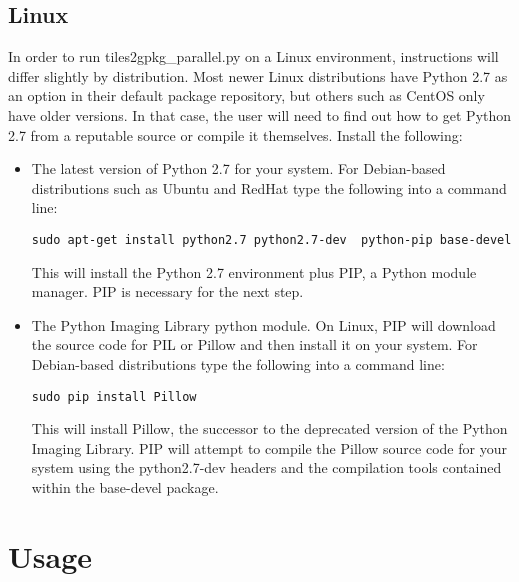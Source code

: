 \documentclass{article}
\begin{document}
\subsection{Linux}
In order to run tiles2gpkg\_parallel.py on a Linux environment, instructions
will differ slightly by distribution.  Most newer Linux distributions have
Python 2.7 as an option in their default package repository, but others such as
CentOS only have older versions.  In that case, the user will need to find out
how to get Python 2.7 from a reputable source or compile it themselves. Install
the following:
\begin{itemize}
    \item
        The latest version of Python 2.7 for your system.  For Debian-based
        distributions such as Ubuntu and RedHat type the following into a
        command line: 

        \lstinline|sudo apt-get install python2.7 python2.7-dev  python-pip base-devel| 

        This will install the Python 2.7 environment plus PIP, a Python
        module manager.  PIP is necessary for the next step.
    \item
        The Python Imaging Library python module.  On Linux, PIP will
        download the source code for PIL or Pillow and then install it on
        your system.  For Debian-based distributions type the following
        into a command line:

        \lstinline|sudo pip install Pillow|

        This will install Pillow, the successor to the deprecated version
        of the Python Imaging Library.  PIP will attempt to compile the
        Pillow source code for your system using the python2.7-dev headers
        and the compilation tools contained within the base-devel package.
\end{itemize}
\section{Usage}
\end{document}
